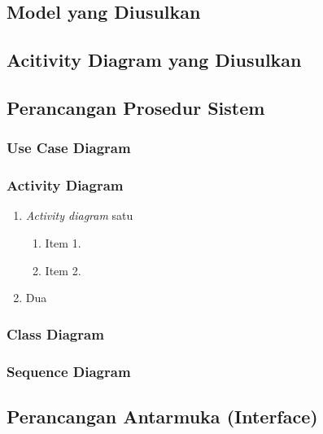 \subsection{Model yang Diusulkan}

\subsection{Acitivity Diagram yang Diusulkan}

\subsection{Perancangan Prosedur Sistem}

\subsubsection{Use Case Diagram}

\subsubsection{Activity Diagram}
\begin{enumerate}[nolistsep,leftmargin=0.5cm]
\item \textit{Activity diagram} satu

\begin{enumerate}[label=\alph*.]
	\item Item 1.
	\item Item 2.
	\end{enumerate}
\item Dua
\end{enumerate}

\subsubsection{Class Diagram}

\subsubsection{Sequence Diagram}

\subsection{Perancangan Antarmuka (Interface)}

\newpage